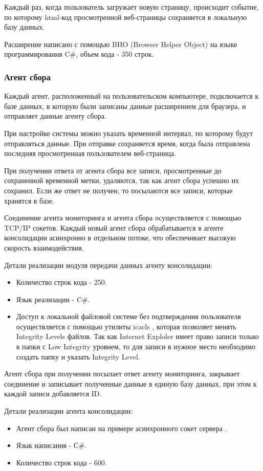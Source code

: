 \documentclass[russian, utf8, emptystyle]{eskdtext}
\begin{document}
Каждый раз, когда пользователь загружает новую страницу, происходит событие, по которому html-код просмотренной веб-страницы сохраняется в локальную базу данных.

Расширение написано с помощью BHO (Browser Helper Object) на языке программирования C\#, объем кода - 350 строк.
\subsubsection{Агент сбора}

Каждый агент, расположенный на пользовательском компьютере, подключается к базе данных, в которую были записаны данные расширением для браузера, и отправляет данные агенту сбора.

При настройке системы можно указать временной интервал, по которому будут отправляться данные. При отправке сохраняется время, когда была отправлена последняя просмотренная пользователем веб-страница.

При получении ответа от агента сбора все записи, просмотренные до сохраненной временной метки, удаляются, так как агент сбора успешно их сохранил. Если же ответ не получен, то посылаются все записи, которые хранятся в базе.

Соединение агента мониторинга и агента сбора осуществляется с помощью TCP/IP сокетов. Каждый новый агент сбора обрабатывается в агенте консолидации асинхронно в отдельном потоке, что обеспечивает высокую скорость взаимодействия.

Детали реализации модуля передачи данных агенту консолидации:
\begin{itemize}
	\item Количество строк кода - 250.
	\item Язык реализации - C\#.
	\item Доступ к локальной файловой системе без подтверждения пользователя осуществляется с помощью утилиты icacls \cite{icacls}, которая позволяет менять Integrity Levels \cite{icacls} файлов. Так как Internet Exploler имеет право записи только в папки с Low Integrity уровнем, то для записи в нужное место необходимо создать папку и указать Integrity Level. 
\end{itemize}

Агент сбора при получении посылает ответ агенту мониторинга, закрывает соединение и записывает полученные данные в единую базу данных, при этом к каждой записи добавляется ID.

Детали реализации агента консолидации:
\begin{itemize}
	\item Агент сбора был написан на примере асинхронного сокет сервера \cite{msdn}.
	\item Язык написания - С\#.
	\item Количество строк кода - 600.
\end{itemize}
\end{document}
